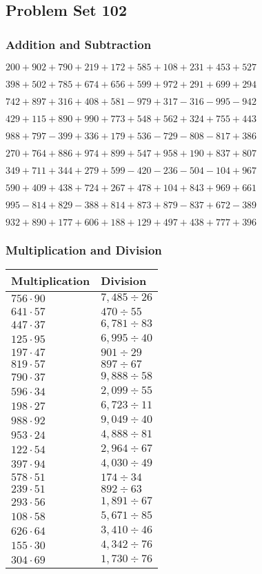 \hypertarget{problem-set-102}{%
\subsection{Problem Set 102}\label{problem-set-102}}

\hypertarget{addition-and-subtraction}{%
\subsubsection{Addition and
Subtraction}\label{addition-and-subtraction}}

\(200 +902 +790 +219 +172 +585 +108 +231 +453 +527\)

\(398 +502 +785 +674 +656 +599 +972 +291 +699 +294\)

\(742 +897 +316 +408 +581 - 979 +317 - 316 - 995 - 942\)

\(429 +115 +890 +990 +773 +548 +562 +324 +755 +443\)

\(988 +797 - 399 +336 +179 +536 - 729 - 808 - 817 +386\)

\(270 +764 +886 +974 +899 +547 +958 +190 +837 +807\)

\(349 +711 +344 +279 +599 - 420 - 236 - 504 - 104 +967\)

\(590 +409 +438 +724 +267 +478 +104 +843 +969 +661\)

\(995 - 814 +829 - 388 +814 +873 +879 - 837 +672 - 389\)

\(932 +890 +177 +606 +188 +129 +497 +438 +777 +396\)

\hypertarget{multiplication-and-division}{%
\subsubsection{Multiplication and
Division}\label{multiplication-and-division}}

\begin{longtable}[]{@{}ll@{}}
\toprule
Multiplication & Division\tabularnewline
\midrule
\endhead
\(756 \cdot 90\) & \(7,485÷26\)\tabularnewline
\(641 \cdot 57\) & \(470÷55\)\tabularnewline
\(447 \cdot 37\) & \(6,781÷83\)\tabularnewline
\(125 \cdot 95\) & \(6,995÷40\)\tabularnewline
\(197 \cdot 47\) & \(901÷29\)\tabularnewline
\(819 \cdot 57\) & \(897÷67\)\tabularnewline
\(790 \cdot 37\) & \(9,888÷58\)\tabularnewline
\(596 \cdot 34\) & \(2,099÷55\)\tabularnewline
\(198 \cdot 27\) & \(6,723÷11\)\tabularnewline
\(988 \cdot 92\) & \(9,049÷40\)\tabularnewline
\(953 \cdot 24\) & \(4,888÷81\)\tabularnewline
\(122 \cdot 54\) & \(2,964÷67\)\tabularnewline
\(397 \cdot 94\) & \(4,030÷49\)\tabularnewline
\(578 \cdot 51\) & \(174 ÷ 34\)\tabularnewline
\(239 \cdot 51\) & \(892÷63\)\tabularnewline
\(293 \cdot 56\) & \(1,891÷67\)\tabularnewline
\(108 \cdot 58\) & \(5,671÷85\)\tabularnewline
\(626 \cdot 64\) & \(3,410÷46\)\tabularnewline
\(155 \cdot 30\) & \(4,342÷76\)\tabularnewline
\(304 \cdot 69\) & \(1,730÷76\)\tabularnewline
\bottomrule
\end{longtable}
